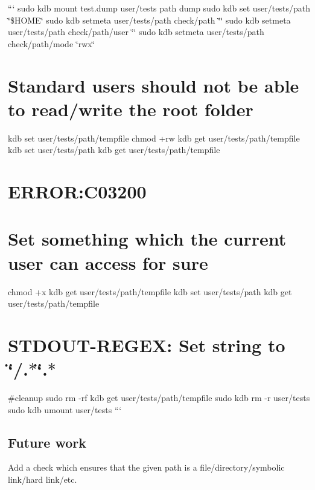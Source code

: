 ``` sudo kdb mount test.\+dump user/tests path dump sudo kdb set user/tests/path \char`\"{}\$\+H\+O\+M\+E\char`\"{} sudo kdb setmeta user/tests/path check/path \char`\"{}\char`\"{} sudo kdb setmeta user/tests/path check/path/user \char`\"{}\char`\"{} sudo kdb setmeta user/tests/path check/path/mode \char`\"{}rwx\char`\"{}

\section*{Standard users should not be able to read/write the root folder}

kdb set user/tests/path/tempfile  chmod +rw {\ttfamily kdb get user/tests/path/tempfile} kdb set user/tests/path {\ttfamily kdb get user/tests/path/tempfile} \section*{E\+R\+R\+OR\+:C03200}

\section*{Set something which the current user can access for sure}

chmod +x {\ttfamily kdb get user/tests/path/tempfile} kdb set user/tests/path {\ttfamily kdb get user/tests/path/tempfile} \section*{S\+T\+D\+O\+U\+T-\/\+R\+E\+G\+EX\+: Set string to \char`\"{}/.$\ast$\char`\"{}.$\ast$}

\#cleanup sudo rm -\/rf {\ttfamily kdb get user/tests/path/tempfile} sudo kdb rm -\/r user/tests sudo kdb umount user/tests ```

\subsection*{Future work}

Add a check which ensures that the given path is a file/directory/symbolic link/hard link/etc. 